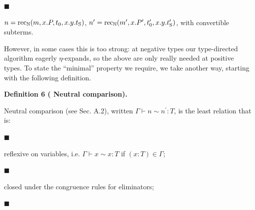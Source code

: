  
 
\par\noindent  $\blacksquare$ 
 
$n=\operatorname{rec}_{\operatorname{\mathbb{N}}}(m,x.P,t_{0},x.y.t_{%
\operatorname{S}})$, $n^{\prime}=\operatorname{rec}_{\operatorname{\mathbb{N}}}(m^{\prime},x.P^{%
\prime},t^{\prime}_{0},x.y.t^{\prime}_{\operatorname{S}})$, with convertible subterms.\par
 
 
  
 
 
 
However, in some cases this is too strong: at negative types our type-directed algorithm eagerly $\eta$-expands, so the above are only really needed at positive types. To state the “minimal” property we require, we take another way, starting with the following definition.\par
 
 
 
\par\medskip\noindent\textbf{Definition 6 (  Neutral comparison).}\par
 
 
Neutral comparison (see Sec. A.2), written $\Gamma\vdash n\sim n^{\prime}\operatorname{\mathrel{:}}T$, is the least relation that is:\par
  
\par\noindent  $\blacksquare$ 
 
reflexive on variables, i.e. $\Gamma\vdash x\sim x\operatorname{\mathrel{:}}T$ if $(x:T)\in\Gamma$;\par
 
 
 
\par\noindent  $\blacksquare$ 
 
closed under the congruence rules for eliminators;\par
 
 
 
\par\noindent  $\blacksquare$ 
 
